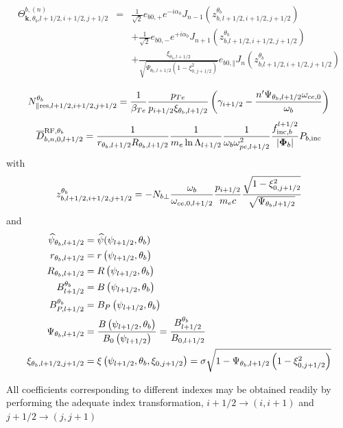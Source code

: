 \begin{eqnarray}
\Theta _{\mathbf{k,}\theta _{b}\text{,}l+1/2,i+1/2,j+1/2}^{b,\left( n\right)
} &=&\frac{1}{\sqrt{2}}e_{b0,+}e^{-i\alpha _{b}}J_{n-1}\left(
z_{b,l+1/2,i+1/2,j+1/2}^{\theta _{b}}\right)   \nonumber \\
&&+\frac{1}{\sqrt{2}}e_{b0,-}e^{+i\alpha _{b}}J_{n+1}\left( z_{b\text{,}%
l+1/2,i+1/2,j+1/2}^{\theta _{b}}\right)   \nonumber \\
&&+\frac{\xi _{\theta _{b},l+1/2}}{\sqrt{\Psi _{\theta _{b},l+1/2}\left(
1-\xi _{0,j+1/2}^{2}\right) }}e_{b0,\Vert }J_{n}\left( z_{b\text{,}%
l+1/2,i+1/2,j+1/2}^{\theta _{b}}\right)\nonumber \\
\end{eqnarray}
\begin{equation}
N_{\Vert \text{res,}l+1/2,i+1/2,j+1/2}^{\theta _{b}}=\frac{1}{\beta _{Te}}%
\frac{p_{Te}}{p_{i+1/2}\xi _{\theta _{b},l+1/2}}\left( \gamma _{i+1/2}-\frac{%
n^{\prime }\Psi _{\theta _{b},l+1/2}\omega _{ce,0}}{\omega _{b}}\right)
\end{equation}
\begin{equation}
\overline{D}_{b,n,0,l+1/2}^{\text{RF,}\theta _{b}}=\frac{1}{r_{\theta
_{b},l+1/2}R_{\theta _{b},l+1/2}}\frac{1}{m_{e}\ln \Lambda _{l+1/2}}\frac{1}{%
\omega _{b}\omega _{pe,l+1/2}^{2}}\frac{f_{\text{inc},b}^{l+1/2}}{\left|
\mathbf{\Phi }_{b}\right| }P_{b,\text{inc}}
\end{equation}
with
\begin{equation}
z_{b\text{,}l+1/2,i+1/2,j+1/2}^{\theta _{b}}=-N_{b\bot }\frac{\omega _{b}}{%
\omega _{ce,0,l+1/2}}\frac{p_{i+1/2}}{m_{e}c}\frac{\sqrt{1-\xi _{0,j+1/2}^{2}%
}}{\sqrt{\Psi _{\theta _{b},l+1/2}}}
\end{equation}
and
\begin{align}
\widehat{\psi }_{\theta _{b},l+1/2}& =\widehat{\psi }(\psi _{l+1/2},\theta
_{b}) \\
r_{\theta _{b},l+1/2}& =r\left( \psi _{l+1/2},\theta _{b}\right)  \\
R_{\theta _{b},l+1/2}& =R\left( \psi _{l+1/2},\theta _{b}\right)  \\
B_{l+1/2}^{\theta _{b}}& =B\left( \psi _{l+1/2},\theta _{b}\right)  \\
B_{P,l+1/2}^{\theta _{b}}& =B_{P}\left( \psi _{l+1/2},\theta _{b}\right)  \\
\Psi _{\theta _{b},l+1/2}& =\frac{B\left( \psi _{l+1/2},\theta _{b}\right) }{%
B_{0}\left( \psi _{l+1/2}\right) }=\frac{B_{l+1/2}^{\theta _{b}}}{B_{0,l+1/2}%
} \\
\xi _{\theta _{b},l+1/2,j+1/2}& =\xi \left( \psi _{l+1/2},\theta _{b},\xi
_{0,j+1/2}\right) =\sigma \sqrt{1-\Psi _{\theta _{b},l+1/2}\left( 1-\xi
_{0,j+1/2}^{2}\right) }
\end{align}

All coefficients corresponding to different indexes may be obtained readily
by performing the adequate index transformation, $i+1/2\rightarrow \left(
i,i+1\right) $ and $j+1/2\rightarrow \left( j,j+1\right) $

